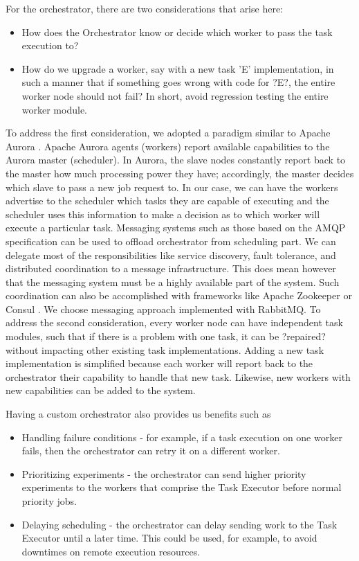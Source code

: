 \documentclass[review]{elsarticle}
\begin{document}
For the orchestrator, there are two considerations that arise here:
\begin{itemize}
\item How does the Orchestrator know or decide which worker to pass the task execution to?
\item How do we upgrade a worker, say with a new task 'E' implementation, in such a manner that if something goes wrong with code for ?E?, the entire worker node should not fail? In short, avoid regression testing the entire worker module.
\end{itemize}

To address the first consideration, we adopted a paradigm similar to Apache Aurora \cite{apacheAurora}.  Apache Aurora agents (workers) report available capabilities to the Aurora master (scheduler). In Aurora, the slave nodes constantly report back to the master how much processing power they have; accordingly, the master decides which slave to pass a new job request to. In our case, we can have the workers advertise to the scheduler which tasks they are capable of executing and the scheduler uses this information to make a decision as to which worker will execute a particular task.
Messaging systems such as those based on the AMQP specification can be used to offload orchestrator from scheduling part. We can delegate most of the responsibilities like service discovery, fault tolerance, and distributed coordination to a message infrastructure. This does mean however that the messaging system must be a highly available part of the system. Such coordination can also be accomplished with  frameworks like Apache Zookeeper \cite{hunt2010zookeeper} or Consul \cite{vargo2016consul}. We choose messaging approach implemented with RabbitMQ. 
To address the second consideration, every worker node can have independent task modules, such that if there is a problem with one task, it can be ?repaired? without impacting other existing task implementations. Adding a new task implementation is simplified because each worker will report back to the orchestrator their capability to handle that new task. Likewise, new workers with new capabilities can be added to the system.  

Having a custom orchestrator also provides us benefits such as
\begin{itemize}
\item Handling failure conditions - for example, if a task execution on one worker fails, then the orchestrator can retry it on a different worker.
\item Prioritizing experiments - the orchestrator can send higher priority experiments to the workers that comprise the Task Executor before normal priority jobs.  
\item Delaying scheduling - the orchestrator can delay sending work to the Task Executor until a later time.   This could be used, for example, to avoid downtimes on remote execution resources. 
\end{itemize}
\end{document}
